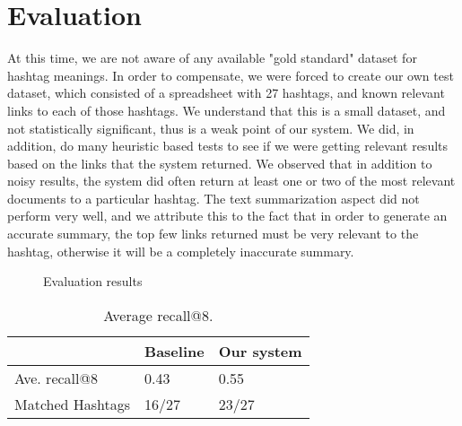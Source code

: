 \section{Evaluation}
 At this time, we are not aware of any available "gold standard" dataset for hashtag meanings.  In order to compensate, we were forced to create our own test dataset, which consisted of a spreadsheet with 27 hashtags, and known relevant links to each of those hashtags. We understand that this is a small dataset, and not statistically significant, thus is a weak point of our system. We did, in addition, do many heuristic based tests to see if we were getting relevant results based on the links that the system returned. We observed that in addition to noisy results, the system did often return at least one or two of the most relevant documents to a particular hashtag. The text summarization aspect did not perform very well, and we attribute this to the fact that in order to generate an accurate summary, the top few links returned must be very relevant to the hashtag, otherwise it will be a completely inaccurate summary.\\
 
 
 \begin{figure}[h!]
   \caption{Evaluation results} \label{fig:recallat8}
\end{figure}



\begin{table}[h]
    \centering
    \caption[Table caption text]{Average recall@8.}
    \label{table:recall}
    \begin{tabular}{ | l | l | l |} \hline
    & Baseline & Our system \\ \hline
    Ave. recall@8 & 0.43 & 0.55 \\ \hline
    Matched Hashtags & 16/27 & 23/27 \\ \hline
    \end{tabular}
    
\end{table}